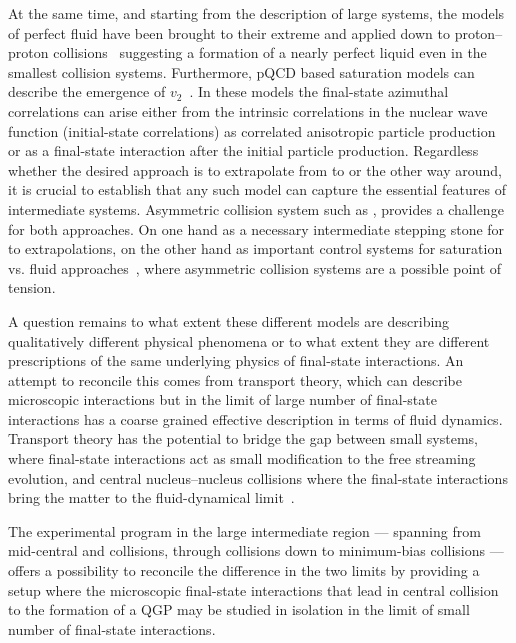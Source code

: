 \documentclass[../report.tex]{subfiles}
\begin{document}
At the same time, and starting from the description of large systems, the models of perfect fluid have been brought to their extreme and applied down to proton--proton collisions~\cite{Werner:2007bf,Weller:2017tsr,Aidala:2018mcw} suggesting a formation of a nearly perfect liquid even in the smallest collision systems. Furthermore, pQCD based saturation models can describe the emergence of $v_2$~\cite{Schenke:2016lrs}. In these models the final-state azimuthal correlations can arise either from the intrinsic correlations in the nuclear wave function (initial-state correlations) as correlated anisotropic particle production or as a final-state interaction after the initial particle production.
Regardless whether the desired approach is to extrapolate from \pp to \PbPb or the other way around, it is crucial to establish that any such model can capture the essential features of intermediate systems. Asymmetric collision system such as \pPb, provides a challenge for both approaches. On one hand as a necessary intermediate stepping stone for \pp to \AOnA extrapolations, on the other hand as important control systems for saturation vs. fluid approaches~\cite{Mace:2018vwq,Nagle:2018ybc}, where asymmetric collision systems are a possible point of tension.

A question remains to what extent these different models are describing qualitatively different physical phenomena or to what extent they are different prescriptions of the same underlying physics of final-state interactions. An attempt to reconcile this comes from transport theory, which can describe microscopic interactions but in the limit of large number of final-state interactions has a coarse grained effective description in terms of fluid dynamics. Transport theory has the potential to bridge the gap between small systems, where final-state interactions act as small modification to the free streaming evolution, and central nucleus--nucleus collisions where the final-state interactions bring the matter to the fluid-dynamical limit~\cite{Kurkela:2018qeb}.

The experimental program in the large intermediate region --- spanning from mid-central \PbPb and \XeXe collisions, through \pPb collisions down to minimum-bias \pp collisions --- offers a possibility to reconcile the difference in the two limits by providing a setup where the microscopic final-state interactions that lead in central \PbPb collision to the formation of a QGP may be studied in isolation in the limit of small number of final-state interactions.
\end{document}
